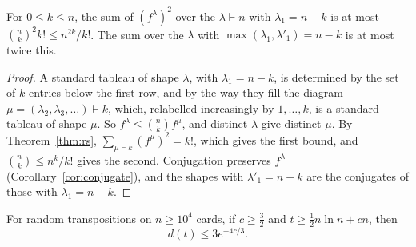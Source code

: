 \begin{lemma}\label{lem:countshapes}
For $0\le k\le n$, the sum of $(f^\lambda)^2$ over the $\lambda\vdash n$ with $\lambda_1=n-k$ is at most $\binom nk^2k!\le n^{2k}/k!$. The sum over the $\lambda$ with $\max(\lambda_1,\lambda'_1)=n-k$ is at most twice this.
\end{lemma}

\begin{proof}
A standard tableau of shape $\lambda$, with $\lambda_1=n-k$, is determined by the set of $k$ entries below the first row, and by the way they fill the diagram $\mu=(\lambda_2,\lambda_3,\dots)\vdash k$, which, relabelled increasingly by $1,\dots,k$, is a standard tableau of shape $\mu$.
So $f^\lambda\le\binom nkf^\mu$, and distinct $\lambda$ give distinct $\mu$. By Theorem~\ref{thm:rs}, $\sum_{\mu\vdash k}(f^\mu)^2=k!$, which gives the first bound, and $\binom nk\le n^k/k!$ gives the second. Conjugation preserves $f^\lambda$ (Corollary~\ref{cor:conjugate}), and the shapes with
$\lambda'_1=n-k$ are the conjugates of those with $\lambda_1=n-k$.
\end{proof}

\begin{theorem}\label{thm:ds}
For random transpositions on $n\ge10^4$ cards, if $c\ge\frac32$ and $t\ge\frac12n\ln n+cn$, then
\[
d(t)\le3e^{-4c/3}.
\]
\end{theorem}


